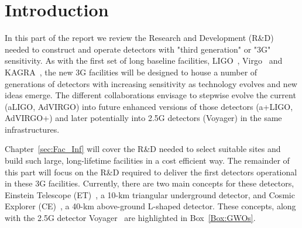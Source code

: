 \chapter{Introduction}
\label{sec:Intro}
\setcounter{page}{1}
\vspace{-1.5cm}
In this part of the report we review the Research and Development (R\&D) needed to construct and operate detectors with "third generation" or "3G" sensitivity. As with the first set of long baseline facilities, LIGO~\cite{AdvancedLIGO2015}, Virgo~\cite{AdvancedVirgo2015} and KAGRA~\cite{KAGRA2013}, the new 3G facilities will be designed to house a number of generations of detectors with increasing sensitivity as technology evolves and new ideas emerge.
The different collaborations envisage to stepwise evolve the current (aLIGO, AdVIRGO)\cite{AdvancedVirgo2015, AdvancedLIGO2015} into future enhanced versions of those detectors (a+LIGO, AdVIRGO+) \cite{Zucker:LIGOAplus, Cagnoli:VirgoAplus} and later potentially into 2.5G detectors (Voyager)\cite{VoyagerDCC2018} in the same infrastructures.

 Chapter~\ref{sec:Fac_Inf} will cover the R\&D needed to select suitable sites and build such large, long-lifetime facilities in a cost efficient way. The remainder of this part will focus on the R\&D required to deliver the first detectors operational in these 3G facilities.  Currently, there are two main concepts for these detectors, Einstein Telescope (ET)~\cite{ET2011}, a 10-km triangular underground detector, and Cosmic Explorer (CE)~\cite{CosmicExplorer2017}, a 40-km above-ground L-shaped detector. These concepts, along with the 2.5G detector Voyager~\cite{Voyager:Inst,VoyagerDCC2018} are highlighted in Box~\ref{Box:GWOs}.

